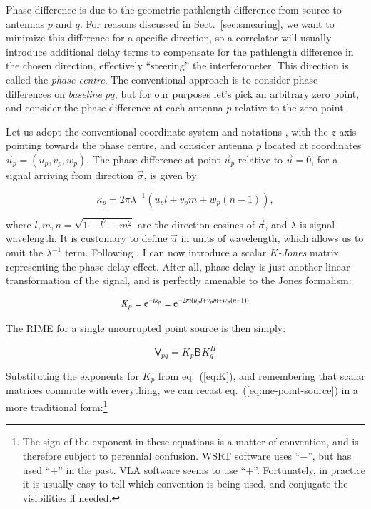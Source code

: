 \documentclass[]{aa}
\newcommand{\herm}{H}
\newcommand{\coh}[2]{\mathsf{{#1}}_{{#2}}}
\begin{document}
Phase difference is due to the geometric pathlength difference from source to antennas $p$ and $q$. For reasons discussed in Sect.~\ref{sec:smearing}, we want to minimize this difference for a specific direction, so a correlator will usually introduce additional delay terms to compensate for the pathlength difference in the chosen direction, effectively ``steering'' the interferometer. This direction is called the {\em phase centre}. The conventional approach is to consider phase differences on {\em baseline} $pq$, but for our purposes let's pick an arbitrary zero point, and consider the phase difference at each antenna $p$ relative to the zero point.

Let us adopt the conventional coordinate system and notations \citep[see e.g.][]{tms}, with the $z$ axis pointing towards the phase centre, and consider antenna $p$ located at coordinates $\vec u_p=(u_p,v_p,w_p)$. The phase difference at point $\vec u_p$ relative to $\vec u=0$, for a signal arriving from direction $\vec\sigma$, is given by

  \[
  \kappa_p = 2\pi\lambda^{-1}(u_p l+v_p m+w_p (n-1)),
  \]

where $l,m,n=\sqrt{1-l^2-m^2}$ are the direction cosines of $\vec\sigma$, and $\lambda$ is signal wavelength. It is customary to define $\vec u$ in units of wavelength, which allows us to omit the $\lambda^{-1}$ term.
Following \citet{JEN:note185}, I can now introduce a scalar {\em $K$-Jones} matrix representing the phase delay effect. After all, phase delay is just another linear transformation of the signal, and is perfectly amenable to the Jones formalism:

  \begin{equation}\label{eq:K}
  K_p = {\rm e}^{-i\kappa_p} = {\rm e}^{-2\pi i(u_p l+v_p m+w_p (n-1))}
  \end{equation}

The RIME for a single uncorrupted point source is then simply:

  \begin{equation}\label{eq:me-point-source}
  \coh{V}{pq} = K_p \coh{B}{}  K^\herm_q
  \end{equation}

Substituting the exponents for $K_p$ from eq.~(\ref{eq:K}), and remembering that scalar matrices commute with everything, we can recast eq.~(\ref{eq:me-point-source}) in a more traditional form:\footnote{The sign of the exponent in these equations is a matter of convention, and is therefore subject to perennial confusion. WSRT software uses ``$-$'', but has used ``$+$'' in the past. VLA software seems to use ``$+$''. Fortunately, in practice it is usually easy to tell which convention is being used, and conjugate the visibilities if needed.}
\end{document}
